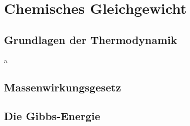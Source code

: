 \section{Chemisches Gleichgewicht}

\subsection{Grundlagen der Thermodynamik}

a

\subsection{Massenwirkungsgesetz}

\subsection{Die Gibbs-Energie}